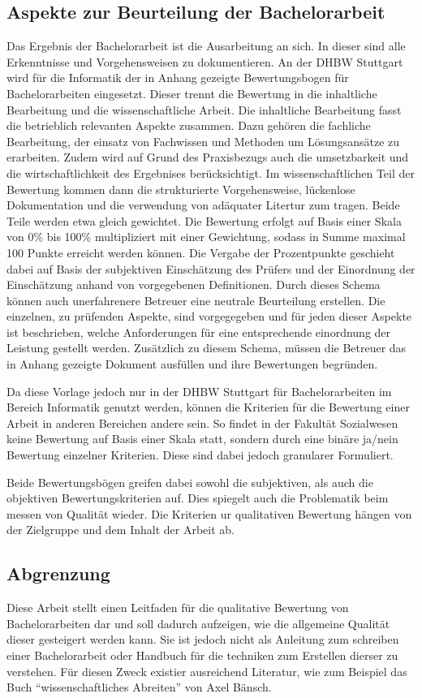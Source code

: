 \subsection{Aspekte zur Beurteilung der Bachelorarbeit}
Das Ergebnis der Bachelorarbeit ist die Ausarbeitung an sich. In dieser sind alle Erkenntnisse und Vorgehensweisen zu dokumentieren. An der \ac{DHBW} Stuttgart wird für die Informatik der in Anhang  gezeigte Bewertungsbogen für Bachelorarbeiten eingesetzt. Dieser trennt die Bewertung in die inhaltliche Bearbeitung und die wissenschaftliche Arbeit. Die inhaltliche Bearbeitung fasst die betrieblich relevanten Aspekte zusammen. Dazu gehören die fachliche Bearbeitung, der einsatz von Fachwissen und Methoden um Lösungsansätze zu erarbeiten. Zudem wird auf Grund des Praxisbezugs auch die umsetzbarkeit und die wirtschaftlichkeit des Ergebnises berücksichtigt. 
Im wissenschaftlichen Teil der Bewertung kommen dann die strukturierte Vorgehensweise, lückenlose Dokumentation und die verwendung von adäquater Litertur zum tragen. 
Beide Teile werden etwa gleich gewichtet. Die Bewertung erfolgt auf Basis einer Skala von 0\% bis 100\% multipliziert mit einer Gewichtung, sodass in Summe maximal 100 Punkte erreicht werden können. Die Vergabe der Prozentpunkte geschieht dabei auf Basis der subjektiven Einschätzung des Prüfers und der Einordnung der Einschätzung anhand von vorgegebenen Definitionen. 
Durch dieses Schema können auch unerfahrenere Betreuer eine neutrale Beurteilung erstellen. Die einzelnen, zu prüfenden Aspekte, sind vorgegegeben und für jeden dieser Aspekte ist beschrieben, welche Anforderungen für eine entsprechende einordnung der Leistung gestellt werden. 
Zusätzlich zu diesem Schema, müssen die Betreuer das in Anhang  gezeigte Dokument ausfüllen und ihre Bewertungen begründen. 

Da diese Vorlage jedoch nur in der \ac{DHBW} Stuttgart für Bachelorarbeiten im Bereich Informatik genutzt werden, können die Kriterien für die Bewertung einer Arbeit in anderen Bereichen andere sein. So findet in der Fakultät Sozialwesen keine Bewertung auf Basis einer Skala statt, sondern durch eine binäre ja/nein Bewertung einzelner Kriterien. Diese sind dabei jedoch granularer Formuliert.\cite[Vgl.][]{DHBW-Sozial:2014}

Beide Bewertungsbögen greifen dabei sowohl die subjektiven, als auch die objektiven Bewertungskriterien auf. Dies spiegelt auch die Problematik beim messen von Qualität wieder. Die Kriterien ur qualitativen Bewertung hängen von der Zielgruppe und dem Inhalt der Arbeit ab.

\subsection{Abgrenzung}
Diese Arbeit stellt einen Leitfaden für die qualitative Bewertung von Bachelorarbeiten dar und soll dadurch aufzeigen, wie die allgemeine Qualität dieser gesteigert werden kann. Sie ist jedoch nicht als Anleitung zum schreiben einer Bachelorarbeit oder Handbuch für die techniken zum Erstellen dierser zu verstehen. Für diesen Zweck existier ausreichend Literatur, wie zum Beispiel das Buch \enquote{wissenschaftliches Abreiten} von Axel Bänsch.\cite{Baensch:2013}
